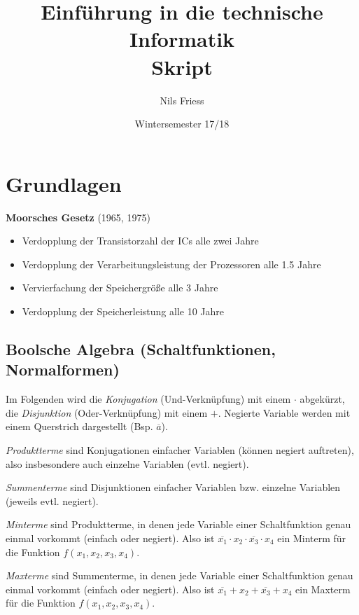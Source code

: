 \documentclass[11pt]{article}
\title{Einführung in die technische Informatik\\
  Skript}
\author{Nils Friess}
\date{Wintersemester 17/18}
\begin{document}
\maketitle 
\thispagestyle{empty}
\newpage

\setcounter{page}{1}
\tableofcontents

\newpage

\section{Grundlagen}

\textbf{Moorsches Gesetz} (1965, 1975)
\begin{itemize}
\item Verdopplung der Transistorzahl der ICs alle zwei Jahre
\item Verdopplung der Verarbeitungsleistung der Prozessoren alle 1.5 Jahre
\item Vervierfachung der Speichergröße alle 3 Jahre
\item Verdopplung der Speicherleistung alle 10 Jahre
\end{itemize}

\subsection{Boolsche Algebra \textnormal{(Schaltfunktionen,  Normalformen)}}

Im Folgenden wird die \textit{Konjugation} (Und-Verknüpfung) mit einem \(\cdot\) abgekürzt, die \textit{Disjunktion} (Oder-Verknüpfung) mit einem \(+\). Negierte Variable werden mit einem Querstrich dargestellt (Bsp. \(\overline{a}\)).

\textit{Produktterme} sind Konjugationen einfacher Variablen (können negiert auftreten), also insbesondere auch einzelne Variablen (evtl. negiert).

\textit{Summenterme} sind Disjunktionen einfacher Variablen bzw. einzelne Variablen (jeweils evtl. negiert).

\textit{Minterme} sind Produktterme, in denen jede Variable einer Schaltfunktion genau einmal vorkommt (einfach oder negiert). Also ist \(\overline{x_1} \cdot x_2 \cdot \overline{x_3} \cdot x_4 \) ein Minterm für die Funktion \(f(x_1,x_2,x_3,x_4) \).

\textit{Maxterme} sind Summenterme, in denen jede Variable einer Schaltfunktion genau einmal vorkommt (einfach oder negiert). Also ist \(\overline{x_1}+x_2+\overline{x_3}+x_4\) ein Maxterm für die Funktion \( f(x_1,x_2,x_3,x_4)\).
\end{document}
